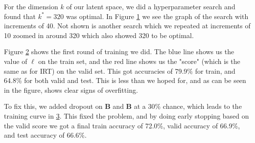 \documentclass[twocolumn]{article}
\begin{document}
\begin{figure}[!ht]
    \centering
    
    \label{fig:kstar}
\end{figure}

For the dimension $k$ of our latent space, we did a hyperparameter search and
found that $k^* = 320$ was optimal. In Figure \ref{fig:kstar} we see the graph
of the search with increments of 40. Not shown is another search which we
repeated at increments of 10 zoomed in around 320 which also showed 320 to be
optimal.

\begin{figure}[!ht]
    \centering
    
    \label{fig:predropout}
\end{figure}

Figure \ref{fig:predropout} shows the first round of training we did. The blue
line shows us the value of $\ell$ on the train set, and the red line shows us
the "score" (which is the same as for IRT) on the valid set. This got
accuracies of 79.9\% for train, and 64.8\% for both valid and test. This is
less than we hoped for, and as can be seen in the figure, shows clear signs of
overfitting.

\begin{figure}[!ht]
    \centering
    
    \label{fig:withdropout}
\end{figure}

To fix this, we added dropout on $\mathbf{B}$ and $\mathbf{B}$ at a 30\%
chance, which leads to the training curve in \ref{fig:withdropout}. This fixed
the problem, and by doing early stopping based on the valid score we got a
final train accuracy of 72.0\%, valid accuracy of 66.9\%, and test accuracy of
66.6\%.
\end{document}
